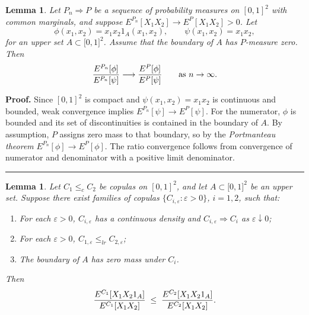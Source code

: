 \documentclass[onecolumn]{article}
\newtheorem{lemma}[theorem]{Lemma}
\newenvironment{proof}[1][Proof]{\noindent\textbf{#1.} }{\ \rule{0.5em}{0.5em}}
\begin{document}
\begin{lemma}
\label{ratio-limit} Let $P_{n}\Rightarrow P$ be a sequence of probability
measures on $[0,1]^{2}$ with common marginals, and suppose $%
E^{P_{n}}[X_{1}X_{2}]\rightarrow E^{P}[X_{1}X_{2}]>0$. Let 
\begin{equation*}
\phi (x_{1},x_{2})=x_{1}x_{2}1_{A}(x_{1},x_{2}),\qquad \psi
(x_{1},x_{2})=x_{1}x_{2},
\end{equation*}%
for an upper set $A\subset \lbrack 0,1]^{2}$. Assume that the boundary of $A$
has $P$-measure zero. Then 
\begin{equation}
\frac{E^{P_{n}}[\phi ]}{E^{P_{n}}[\psi ]}\longrightarrow \frac{E^{P}[\phi ]}{%
E^{P}[\psi ]}\qquad \text{as }n\rightarrow \infty .  \label{823.2}
\end{equation}
\end{lemma}

\begin{proof}
\noindent Since $[0,1]^{2}$ is compact and $\psi (x_{1},x_{2})=x_{1}x_{2}$
is continuous and bounded, weak convergence implies $E^{P_{n}}[\psi
]\rightarrow E^{P}[\psi ]$. For the numerator, $\phi $ is bounded and its
set of discontinuities is contained in the boundary of $A$. By assumption, $%
P $ assigns zero mass to that boundary, so by the \textit{Portmanteau theorem%
} $E^{P_{n}}[\phi ]\rightarrow E^{P}[\phi ]$. The ratio convergence follows
from convergence of numerator and denominator with a positive limit
denominator.
\end{proof}

\begin{lemma}
\label{main-comp} Let $C_{1}\leq _{c}C_{2}$ be copulas on $[0,1]^{2}$, and
let $A\subset \lbrack 0,1]^{2}$ be an upper set. Suppose there exist
families of copulas $\{C_{i,\varepsilon }:\varepsilon >0\}$, $i=1,2$, such
that:

\begin{enumerate}
\item For each $\varepsilon >0$, $C_{i,\varepsilon }$ has a continuous
density and $C_{i,\varepsilon }\Rightarrow C_{i}$ as $\varepsilon \downarrow
0$;

\item For each $\varepsilon >0$, $C_{1,\varepsilon }\leq
_{lr}C_{2,\varepsilon }$;

\item The boundary of $A$ has zero mass under $C_{i}$.
\end{enumerate}

Then 
\begin{equation}
\frac{E^{C_{1}}[X_{1}X_{2}1_{A}]}{E^{C_{1}}[X_{1}X_{2}]}\;\leq \;\frac{%
E^{C_{2}}[X_{1}X_{2}1_{A}]}{E^{C_{2}}[X_{1}X_{2}]}.  \label{824}
\end{equation}
\end{lemma}
\end{document}
